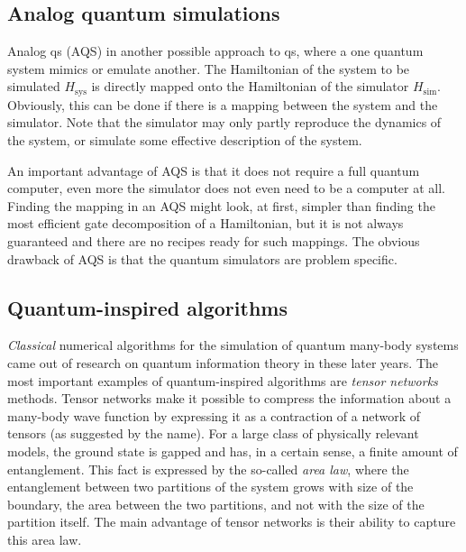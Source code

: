 \subsection{Analog quantum simulations}
\label{sub:analog_quantum_simulations}

Analog \ac{qs} (AQS) in another possible approach to \ac{qs}, where a one quantum system mimics or emulate another.
The Hamiltonian of the system to be simulated $H_{\text{sys}}$ is directly mapped onto the Hamiltonian of the simulator $H_{\text{sim}}$.
Obviously, this can be done if there is a mapping between the system and the simulator.
Note that the simulator may only partly reproduce the dynamics of the system, or simulate some effective description of the system.

An important advantage of AQS is that it does not require a full quantum computer, even more the simulator does not even need to be a computer at all.
Finding the mapping in an AQS might look, at first, simpler than finding the most efficient gate decomposition of a Hamiltonian, but it is not always guaranteed and there are no recipes ready for such mappings.
The obvious drawback of AQS is that the quantum simulators are problem specific.



\subsection{Quantum-inspired algorithms}
\label{sub:quantum_inspired_algorithms}

\emph{Classical} numerical algorithms for the simulation of quantum many-body systems came out of research on quantum information theory in these later years.
The most important examples of quantum-inspired algorithms are \emph{tensor networks} methods.
Tensor networks make it possible to compress the information about a many-body wave function by expressing it as a contraction of a network of tensors (as suggested by the name).
For a large class of physically relevant models, the ground state is gapped and has, in a certain sense, a finite amount of entanglement.
This fact is expressed by the so-called \emph{area law}, where the entanglement between two partitions of the system grows with size of the boundary, the area between the two partitions, and not with the size of the partition itself.
The main advantage of tensor networks is their ability to capture this area law.

